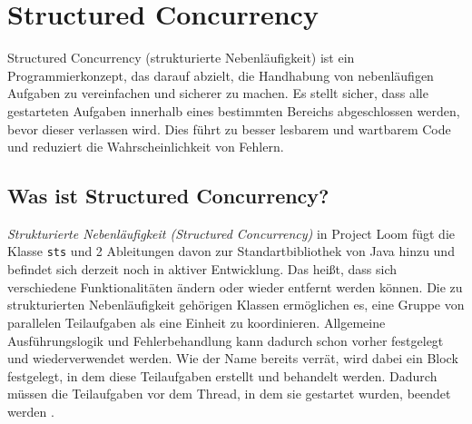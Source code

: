 \section{Structured Concurrency}                                 %
\label{sec:Structured Concurrency}

    Structured Concurrency (strukturierte Nebenläufigkeit) ist ein Programmierkonzept, das darauf abzielt, die Handhabung von nebenläufigen Aufgaben zu vereinfachen und sicherer zu machen.
    Es stellt sicher, dass alle gestarteten Aufgaben innerhalb eines bestimmten Bereichs abgeschlossen werden, bevor dieser verlassen wird.
    Dies führt zu besser lesbarem und wartbarem Code und reduziert die Wahrscheinlichkeit von Fehlern.

\subsection{Was ist Structured Concurrency?}
\label{subsec:WasistSC?}
    \emph{Strukturierte Nebenläufigkeit (Structured Concurrency)} in Project Loom fügt die Klasse \texttt{\gls{sts}} und 2 Ableitungen davon zur Standartbibliothek von Java hinzu
    und befindet sich derzeit noch in
    aktiver Entwicklung. Das heißt, dass sich verschiedene Funktionalitäten ändern oder wieder entfernt werden können.
    Die zu strukturierten Nebenläufigkeit gehörigen Klassen ermöglichen
    es, eine Gruppe von parallelen Teilaufgaben als eine Einheit zu koordinieren. Allgemeine Ausführungslogik und Fehlerbehandlung kann dadurch schon vorher festgelegt und 
    wiederverwendet werden.
    Wie der Name bereits verrät, wird dabei ein Block festgelegt, in dem diese Teilaufgaben erstellt und behandelt werden.
    Dadurch müssen die Teilaufgaben vor dem Thread, in dem sie gestartet wurden, beendet werden \cite{oracle21SC}.


